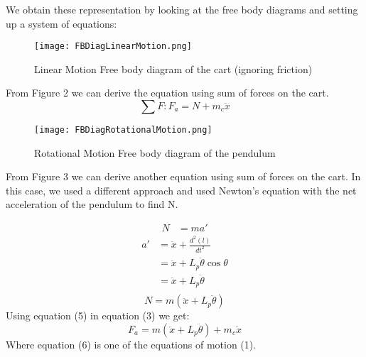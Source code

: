 \documentclass[11pt, twoside, letterpaper]{article}   	%
\begin{document}
We obtain these representation by looking at the free body diagrams and setting up 
a system of equations:\\
\begin{figure}[htbp]
\begin{center}
\texttt{[image: FBDiagLinearMotion.png]}
\caption{Linear Motion Free body diagram of the cart (ignoring friction)}
\label{default}
\end{center}
\end{figure}
\FloatBarrier

From Figure 2 we can derive the equation using sum of forces on the cart.
\begin{equation}
\sum F: F_a=N+m_c\ddot{x}
\end{equation}


\begin{figure}[htbp]
\begin{center}
\texttt{[image: FBDiagRotationalMotion.png]}
\caption{Rotational Motion Free body diagram of the pendulum}
\label{default}
\end{center}
\end{figure}
\FloatBarrier

From Figure 3 we can derive another equation using sum of forces on the cart.
In this case, we used a different approach and used Newton's equation with the 
net acceleration of the pendulum to find N.

\begin{align}
N &= ma'
\end{align}
\begin{align*}
a'&= \ddot{x}+\frac{d^2(l)}{dt^2}\\
 &= \ddot{x}+L_p\ddot{\theta}\cos{\theta}\\
 &= \ddot{x}+L_p\ddot{\theta}\\
\end{align*}
\begin{equation}
N = m(\ddot{x}+L_p\ddot{\theta})
\end{equation}
Using equation (5) in equation (3) we get:
\begin{equation}
F_a=m(\ddot{x}+L_p\ddot{\theta})+m_c\ddot{x}
\end{equation}
Where equation (6) is one of the equations of motion (1).
\end{document}
